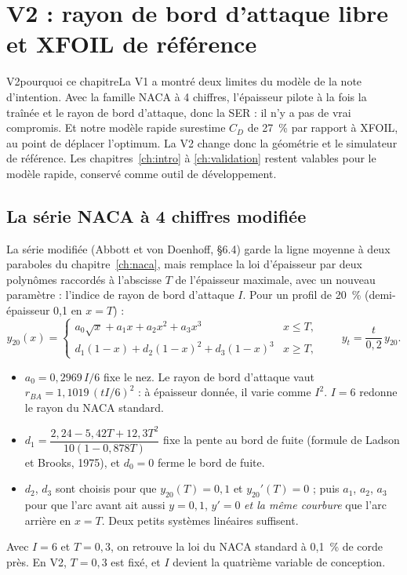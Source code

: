 \chapter{V2 : rayon de bord d'attaque libre et XFOIL de référence}\label{ch:v2}

\begin{evolution}{V2}{pourquoi ce chapitre}La V1 a montré deux limites du modèle de la note d'intention. Avec la famille NACA à 4 chiffres, l'épaisseur pilote à la fois la traînée et le rayon de bord d'attaque, donc la SER : il n'y a pas de vrai compromis. Et notre modèle rapide surestime $C_D$ de 27~\% par rapport à XFOIL, au point de déplacer l'optimum. La V2 change donc la géométrie et le simulateur de référence. Les chapitres~\ref{ch:intro} à \ref{ch:validation} restent valables pour le modèle rapide, conservé comme outil de développement.\end{evolution}

\section{La série NACA à 4 chiffres modifiée}
La série modifiée (Abbott et von Doenhoff, §6.4) garde la ligne moyenne à deux paraboles du chapitre~\ref{ch:naca}, mais remplace la loi d'épaisseur par deux polynômes raccordés à l'abscisse $T$ de l'épaisseur maximale, avec un nouveau paramètre : l'indice de rayon de bord d'attaque $I$. Pour un profil de 20~\% (demi-épaisseur 0,1 en $x=T$) :
\[
y_{20}(x)=\begin{cases}a_0\sqrt x+a_1x+a_2x^2+a_3x^3 & x\le T,\\ d_1(1-x)+d_2(1-x)^2+d_3(1-x)^3 & x\ge T,\end{cases}
\qquad y_t=\frac{t}{0{,}2}\,y_{20}.
\]
\begin{itemize}
\item $a_0=0{,}2969\,I/6$ fixe le nez. Le rayon de bord d'attaque vaut $r_{BA}=1{,}1019\,(tI/6)^2$ : à épaisseur donnée, il varie comme $I^2$. $I=6$ redonne le rayon du NACA standard.
\item $d_1=\dfrac{2{,}24-5{,}42T+12{,}3T^2}{10(1-0{,}878T)}$ fixe la pente au bord de fuite (formule de Ladson et Brooks, 1975), et $d_0=0$ ferme le bord de fuite.
\item $d_2$, $d_3$ sont choisis pour que $y_{20}(T)=0{,}1$ et $y_{20}'(T)=0$ ; puis $a_1$, $a_2$, $a_3$ pour que l'arc avant ait aussi $y=0{,}1$, $y'=0$ \emph{et la même courbure} que l'arc arrière en $x=T$. Deux petits systèmes linéaires suffisent.
\end{itemize}
Avec $I=6$ et $T=0{,}3$, on retrouve la loi du NACA standard à 0,1~\% de corde près. En V2, $T=0{,}3$ est fixé, et $I$ devient la quatrième variable de conception.

